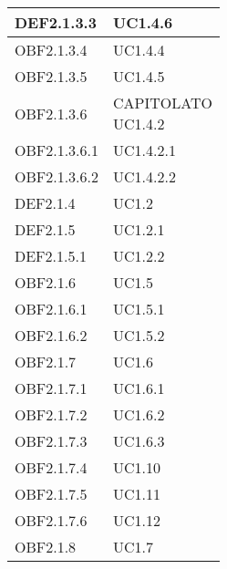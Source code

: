 \documentclass{scalatekids-article}
\begin{document}
\begin{longtable}[H]{|p{5.5cm}|p{5.5cm}|}
\hline
DEF2.1.3.3 & \multiLineCell[t]{UC1.4.6\\}\\
\hline
OBF2.1.3.4 & \multiLineCell[t]{UC1.4.4\\}\\
\hline
OBF2.1.3.5 & \multiLineCell[t]{UC1.4.5\\}\\
\hline
OBF2.1.3.6 & \multiLineCell[t]{CAPITOLATO\\UC1.4.2\\}\\
\hline
OBF2.1.3.6.1 & \multiLineCell[t]{UC1.4.2.1\\}\\
\hline
OBF2.1.3.6.2 & \multiLineCell[t]{UC1.4.2.2\\}\\
\hline
DEF2.1.4 & \multiLineCell[t]{UC1.2\\}\\
\hline
DEF2.1.5 & \multiLineCell[t]{UC1.2.1\\}\\
\hline
DEF2.1.5.1 & \multiLineCell[t]{UC1.2.2\\}\\
\hline
OBF2.1.6 & \multiLineCell[t]{UC1.5\\}\\
\hline
OBF2.1.6.1 & \multiLineCell[t]{UC1.5.1\\}\\
\hline
OBF2.1.6.2 & \multiLineCell[t]{UC1.5.2\\}\\
\hline
OBF2.1.7 & \multiLineCell[t]{UC1.6\\}\\
\hline
OBF2.1.7.1 & \multiLineCell[t]{UC1.6.1\\}\\
\hline
OBF2.1.7.2 & \multiLineCell[t]{UC1.6.2\\}\\
\hline
OBF2.1.7.3 & \multiLineCell[t]{UC1.6.3\\}\\
\hline
OBF2.1.7.4 & \multiLineCell[t]{UC1.10\\}\\
\hline
OBF2.1.7.5 & \multiLineCell[t]{UC1.11\\}\\
\hline
OBF2.1.7.6 & \multiLineCell[t]{UC1.12\\}\\
\hline
OBF2.1.8 & \multiLineCell[t]{UC1.7\\}\\

\end{longtable}
\end{document}
